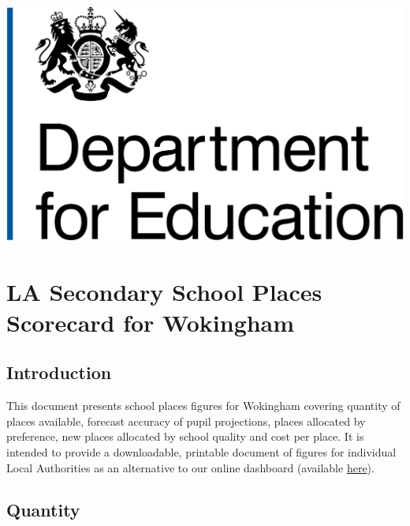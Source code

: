 \documentclass[
]{article}
\author{}
\date{\vspace{-2.5em}}
\begin{document}
\includegraphics[width=0.25\linewidth]{"images/Department_for_Education.png"}
\vspace{2.4cm}

\hypertarget{la-secondary-school-places-scorecard-for-wokingham}{%
\section{LA Secondary School Places Scorecard for
Wokingham}\label{la-secondary-school-places-scorecard-for-wokingham}}

\vspace{3.2cm}
\vspace*{\fill}
\color{dfeheadingblue}{\hrule}
\color{black}

\hypertarget{introduction}{%
\subsection{Introduction}\label{introduction}}

This document presents school places figures for Wokingham covering
quantity of places available, forecast accuracy of pupil projections,
places allocated by preference, new places allocated by school quality
and cost per place. It is intended to provide a downloadable, printable
document of figures for individual Local Authorities as an alternative
to our online dashboard (available
\href{https://department-for-education.shinyapps.io/la-school-places-scorecards/}{here}).

\vspace{12pt}

\newpage

\hypertarget{quantity}{%
\subsection{Quantity}\label{quantity}}

\end{document}

